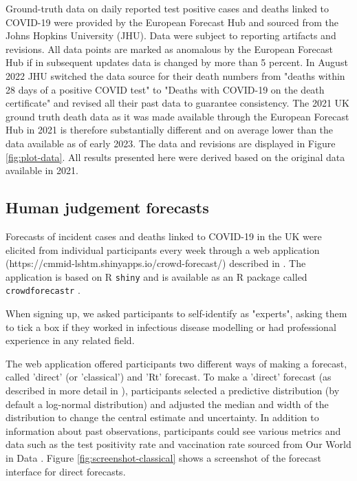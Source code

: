 \documentclass[10pt,a4paper,twocolumn]{article}
\begin{document}
Ground-truth data on daily reported test positive cases and deaths linked to COVID-19 were provided by the European Forecast Hub and sourced from the Johns Hopkins University (JHU). Data were subject to reporting artifacts and revisions. All data points are marked as anomalous by the European Forecast Hub if in subsequent updates data is changed by more than 5 percent. In August 2022 JHU switched the data source for their death numbers from "deaths within 28 days of a positive COVID test" to "Deaths with COVID-19 on the death certificate" and revised all their past data to guarantee consistency. The 2021 UK ground truth death data as it was made available through the European Forecast Hub in 2021 is therefore substantially different and on average lower than the data available as of early 2023. The data and revisions are displayed in Figure \ref{fig:plot-data}. All results presented here were derived based on the original data available in 2021. 

\subsection*{Human judgement forecasts}

Forecasts of incident cases and deaths linked to COVID-19 in the UK were elicited from individual participants every week through a web application (https://cmmid-lshtm.shinyapps.io/crowd-forecast/) described in \cite{bosseComparingHumanModelbased2022}. The application is based on \textsf{R} \cite{R} \texttt{shiny} \cite{shiny} and is available as an \textsf{R} package called \texttt{crowdforecastr} \citep{crowdforecastr}. 

When signing up, we asked participants to self-identify as "experts", asking them to tick a box if they worked in infectious disease modelling or had professional experience in any related field. 

The web application offered participants two different ways of making a forecast, called 'direct' (or 'classical') and 'Rt' forecast. To make a 'direct' forecast (as described in more detail in \cite{bosseComparingHumanModelbased2022}), participants selected a predictive distribution (by default a log-normal distribution) and adjusted the median and width of the distribution to change the central estimate and uncertainty. In addition to information about past observations, participants could see various metrics and data such as the test positivity rate and vaccination rate sourced from Our World in Data \citep{owidcoronavirus}. Figure \ref{fig:screenshot-classical} shows a screenshot of the forecast interface for direct forecasts. 
\end{document}
